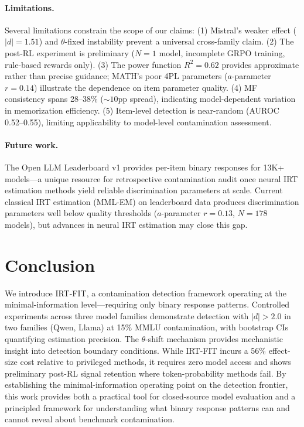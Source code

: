 \documentclass[11pt,a4paper]{article}
\begin{document}
\paragraph{Limitations.}
Several limitations constrain the scope of our claims:
(1) Mistral's weaker effect ($|d|{=}1.51$) and $\theta$-fixed instability prevent a universal cross-family claim.
(2) The post-RL experiment is preliminary ($N{=}1$ model, incomplete GRPO training, rule-based rewards only).
(3) The power function $R^2{=}0.62$ provides approximate rather than precise guidance; MATH's poor 4PL parameters ($a$-parameter $r{=}0.14$) illustrate the dependence on item parameter quality.
(4) MF consistency spans 28--38\% (${\sim}10$pp spread), indicating model-dependent variation in memorization efficiency.
(5) Item-level detection is near-random (AUROC 0.52--0.55), limiting applicability to model-level contamination assessment.

\paragraph{Future work.}
The Open LLM Leaderboard v1 provides per-item binary responses for 13K+ models---a unique resource for retrospective contamination audit once neural IRT estimation methods yield reliable discrimination parameters at scale.
Current classical IRT estimation (MML-EM) on leaderboard data produces discrimination parameters well below quality thresholds ($a$-parameter $r{=}0.13$, $N{=}178$ models), but advances in neural IRT estimation may close this gap.

\section{Conclusion}
\label{sec:conclusion}

We introduce \textsc{IRT-FIT}, a contamination detection framework operating at the minimal-information level---requiring only binary response patterns.
Controlled experiments across three model families demonstrate detection with $|d|{>}2.0$ in two families (Qwen, Llama) at 15\% MMLU contamination, with bootstrap CIs quantifying estimation precision.
The $\theta$-shift mechanism provides mechanistic insight into detection boundary conditions.
While \textsc{IRT-FIT} incurs a 56\% effect-size cost relative to privileged methods, it requires zero model access and shows preliminary post-RL signal retention where token-probability methods fail.
By establishing the minimal-information operating point on the detection frontier, this work provides both a practical tool for closed-source model evaluation and a principled framework for understanding what binary response patterns can and cannot reveal about benchmark contamination.
\end{document}
